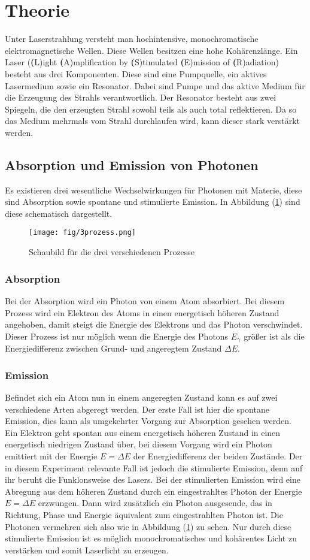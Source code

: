 \section{Theorie}
\label{sec:Theorie}
Unter Laserstrahlung versteht man hochintensive, monochromatische elektromagnetische Wellen. Diese Wellen besitzen eine hohe Kohärenzlänge.
Ein Laser (\textbf(L)ight \textbf(A)mplification by \textbf(S)timulated \textbf(E)mission of \textbf(R)adiation) besteht aus drei Komponenten. Diese sind
eine Pumpquelle, ein aktives Lasermedium sowie ein Resonator. Dabei sind Pumpe und das aktive Medium für die Erzeugung des Strahls verantwortlich. Der Resonator besteht aus zwei Spiegeln, die den erzeugten Strahl sowohl teils als
auch total reflektieren. Da so das Medium mehrmals vom Strahl durchlaufen wird, kann dieser stark verstärkt werden.
\subsection{Absorption und Emission von Photonen}
\label{sec:theorie1}
Es existieren drei wesentliche Wechselwirkungen für Photonen mit Materie, diese sind Absorption sowie spontane und stimulierte Emission.
In Abbildung (\ref{fig:3prozess}) sind diese schematisch dargestellt.
\begin{figure}[h!]
  \centering
  \texttt{[image: fig/3prozess.png]}
  \caption{Schaubild für die drei verschiedenen Prozesse \cite{Anleitung1}}
  \label{fig:3prozess}
\end{figure}
\subsubsection{Absorption}
Bei der Absorption wird ein Photon von einem Atom absorbiert. Bei diesem Prozess wird ein Elektron des Atoms in einen energetisch höheren Zustand angehoben, damit steigt die Energie des Elektrons und das Photon verschwindet.
Dieser Prozess ist nur möglich wenn die Energie des Photons $E_\mathrm{\gamma}$ größer ist als die Energiedifferenz zwischen Grund- und angeregtem Zustand $\Delta E$.
\subsubsection{Emission}
\label{sec:emissionen}
Befindet sich ein Atom nun in einem angeregten Zustand kann es auf zwei verschiedene Arten abgeregt werden. Der erste Fall ist hier die spontane Emission, dies kann als umgekehrter Vorgang zur Absorption gesehen werden.
Ein Elektron geht spontan aus einem energetisch höheren Zustand in einen energetisch niedrigen Zustand über, bei diesem Vorgang wird ein Photon emittiert mit der Energie $E=\Delta E$ der Energiedifferenz der beiden Zustände.
Der in diesem Experiment relevante Fall ist jedoch die stimulierte Emission, denn auf ihr beruht die Funklonsweise des Lasers. Bei der stimulierten Emission wird eine Abregung aus dem höheren Zustand durch ein eingestrahltes
Photon der Energie $E=\Delta E$ erzwungen. Dann wird zusätzlich ein Photon ausgesende, das in Richtung, Phase und Energie äquivalent zum eingestrahlten Photon ist. Die Photonen vermehren sich also wie in Abbildung (\ref{fig:3prozess}) zu sehen. Nur durch diese stimulierte Emission ist es möglich monochromatisches und kohärentes Licht zu verstärken und somit Laserlicht zu erzeugen.
